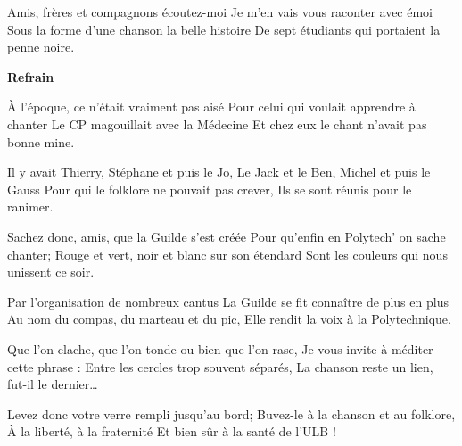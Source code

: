 \footnotemark [
ititle={In memoriam},
tu={De rolders in de nacht}]


\beginverse
Amis, frères et compagnons écoutez-moi
Je m'en vais vous raconter avec émoi
Sous la forme d'une chanson la belle histoire
De sept étudiants qui portaient la penne noire.
\endverse

\beginchorus
\textbf{Refrain}
\endchorus

\beginverse
À l'époque, ce n'était vraiment pas aisé
Pour celui qui voulait apprendre à chanter
Le CP magouillait avec la Médecine
Et chez eux le chant n'avait pas bonne mine.
\endverse

\beginverse
Il y avait Thierry, Stéphane et puis le Jo,
Le Jack et le Ben, Michel et puis le Gauss
Pour qui le folklore ne pouvait pas crever,
Ils se sont réunis pour le ranimer.
\endverse

\beginverse
Sachez donc, amis, que la Guilde s'est créée
Pour qu'enfin en Polytech' on sache chanter;
Rouge et vert, noir et blanc sur son étendard
Sont les couleurs qui nous unissent ce soir.
\endverse

\beginverse
Par l'organisation de nombreux cantus
La Guilde se fit connaître de plus en plus
Au nom du compas, du marteau et du pic,
Elle rendit la voix à la Polytechnique.
\endverse

\beginverse
Que l'on clache, que l'on tonde ou bien que l'on rase,
Je vous invite à méditer cette phrase :
Entre les cercles trop souvent séparés,
La chanson reste un lien, fut-il le dernier…
\endverse

\beginverse
Levez donc votre verre rempli jusqu'au bord;
Buvez-le à la chanson et au folklore,
À la liberté, à la fraternité
Et bien sûr à la santé de l'ULB !
\endverse
\endsong